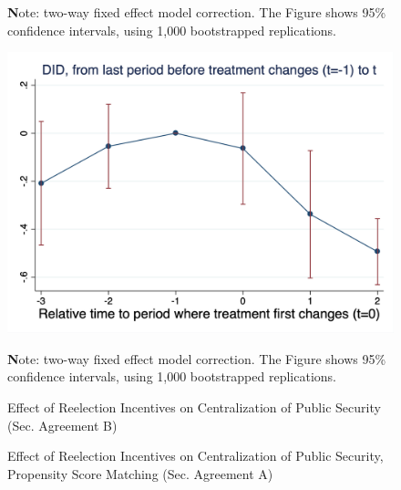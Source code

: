 \documentclass[12pt]{amsart}
\numberwithin{equation}{section}
\theoremstyle{definition}
\theoremstyle{definition}
\theoremstyle{definition}
\begin{document}
\begin{appendix}
\begin{figure}[h]
 {\textbf Note: \citet{chaisemarting_etal_2019} two-way fixed effect model correction. The Figure shows 95\% confidence intervals, using 1,000 bootstrapped replications.} 
\end{figure} 

\begin{figure}[h]  
\centering
\caption{Effect of Reelection Incentives on Centralization of Public Security (Sec. Agreement B)} 
\label{fig:chaisemartin_acuerdo2}

      
\includegraphics[width=1\textwidth]{Figures/chaisemartin_acuerdo2.png}
       
 {\textbf Note: \citet{chaisemarting_etal_2019} two-way fixed effect model correction. The Figure shows 95\% confidence intervals, using 1,000 bootstrapped replications.} 
\end{figure} 


\begin{figure}[h]  
\centering
\caption{Effect of Reelection Incentives on Centralization of Public Security, Propensity Score Matching (Sec. Agreement A)} 
\label{fig:psm_acuerdo}


\end{figure}
\end{appendix}
\end{document}
